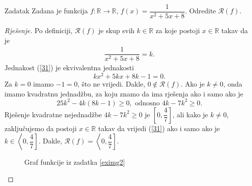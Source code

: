 \begin{exercise}{Zadatak}
\label{eximg2}
Zadana je funkcija \(f : \mathbb{R}\to \mathbb{R}\), \(f(x)=\dfrac{1}{x^2+5x+8}\). Odredite \(\mathcal{R}(f)\).
\end{exercise}
\begin{proof}[Rješenje]
Po definiciji, \(\mathcal{R}(f)\) je skup svih \(k\in \mathbb{R}\) za koje postoji \(x\in \mathbb{R}\) takav da je
\begin{gather}
\label{31}
\dfrac{1}{x^2+5x+8}=k.
\end{gather}
Jednakost (\ref{31}) je ekvivalentna jednakosti
\[kx^2+5kx+8k-1=0.\]
Za \(k=0\) imamo \(-1=0\), što ne vrijedi. Dakle, \(0\notin \mathcal{R}(f)\). Ako je \(k\neq 0\), onda imamo kvadratnu jednadžbu, za koju znamo da ima rješenja ako i samo ako je
\[25k^2-4k(8k-1)\geq 0,\text{ odnosno } 4k-7k^2\geq 0.\]
Rješenje kvadratne nejednadžbe \(4k-7k^2\geq 0\) je \(\left[0, \dfrac{4}{7}\right]\), ali kako je \(k\neq 0\), zaključujemo da postoji \(x\in \mathbb{R}\) takav da vrijedi (\ref{31}) ako i samo ako je \(k\in \left\langle 0, \dfrac{4}{7}\right]\). Dakle, \(\mathcal{R}(f)=\left\langle 0, \dfrac{4}{7}\right]\).
\begin{figure}[ht]
\begin{center}
\end{center}
\caption{\label{exim2} Graf funkcije iz zadatka \ref{eximg2}}
\end{figure}
\end{proof}

